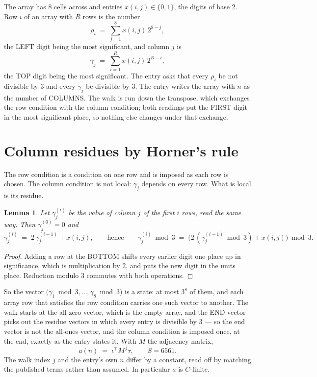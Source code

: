 \documentclass[11pt,a4paper]{article}
\theoremstyle{plain}
\newtheorem{lemma}[theorem]{Lemma}
\theoremstyle{definition}
\begin{document}
The array has $8$ cells across and entries $x(i,j)\in\{0,1\}$, the digits of
base $2$. Row $i$ of an array with $R$ rows is the number
\[
\rho_i\;=\;\sum_{j=1}^{8}x(i,j)\,2^{8-j} ,
\]
the LEFT digit being the most significant, and column $j$ is
\[
\gamma_j\;=\;\sum_{i=1}^{R}x(i,j)\,2^{R-i} ,
\]
the TOP digit being the most significant. The entry asks that every $\rho_i$ be not divisible by
$3$ and every $\gamma_j$ be divisible by $3$. The entry writes the array with $n$ as the number of COLUMNS. The walk is run down the transpose, which exchanges the row condition with the column condition; both readings put the FIRST digit in the most significant place, so nothing else changes under that exchange.


\section{Column residues by Horner's rule}

The row condition is a condition on one row and is imposed as each row is chosen. The column
condition is not local: $\gamma_j$ depends on every row. What is local is its residue.

\begin{lemma}\label{lem:horner}
Let $\gamma_j^{(i)}$ be the value of column $j$ of the first $i$ rows, read the same way.
Then $\gamma_j^{(0)}=0$ and
\[
\gamma_j^{(i)}\;=\;2\,\gamma_j^{(i-1)}+x(i,j),
\qquad\text{hence}\qquad
\gamma_j^{(i)}\bmod 3\;=\;
\bigl(2\,(\gamma_j^{(i-1)}\bmod 3)+x(i,j)\bigr)\bmod 3 .
\]
\end{lemma}

\begin{proof}
Adding a row at the BOTTOM shifts every earlier digit one place up in significance, which is
multiplication by $2$, and puts the new digit in the units place. Reduction modulo
$3$ commutes with both operations.
\end{proof}

So the vector $\bigl(\gamma_1\bmod 3,\dots,\gamma_{8}\bmod
3\bigr)$ is a state: at most $3^{8}$ of them, and each array row
that satisfies the row condition carries one such vector to another. The walk starts at the
all-zero vector, which is the empty array, and the END vector picks out the residue vectors in
which every entry is divisible by $3$ --- so the end vector is not the all-ones
vector, and the column condition is imposed once, at the end, exactly as the entry states it.
With $M$ the adjacency matrix,
\[
a(n)\;=\;\iota^{\!\top}M^{\,j}\tau ,\qquad S=6561.
\]
The walk index $j$ and the entry's own $n$ differ by a constant, read off by matching the
published terms rather than assumed. In particular $a$ is $C$-finite.
\end{document}
